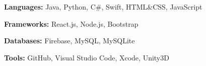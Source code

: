 
\begin{cvparagraph}
\begin{itemize*}
\item \textbf{Languages:} Java, Python, C\#, Swift, HTML\&CSS, JavaScript
\item \textbf{Frameworks:} React.js, Node.js, Bootstrap
\item \textbf{Databases:} Firebase, MySQL, MySQLite
\item \textbf{Tools:} GitHub, Visual Studio Code, Xcode, Unity3D
\end{itemize*}
\end{cvparagraph}
